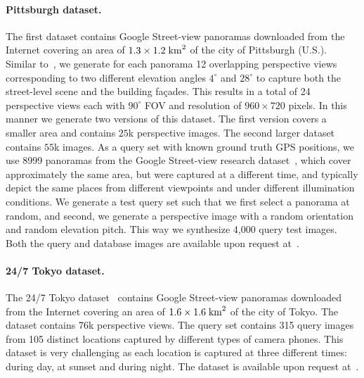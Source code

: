     \paragraph{Pittsburgh dataset.}
      \textcolor{petr}{
 The first dataset contains Google Street-view panoramas downloaded from the Internet covering an area of $1.3 \times 1.2 \; {\rm km}^2$ of the city of Pittsburgh (U.S.). Similar to~\cite{Chen11}, we generate for each panorama 12 overlapping perspective views corresponding to two different elevation angles $4^\circ$ and $28^\circ$ to capture both the street-level scene and the building fa\c{c}ades. This results in a total of 24 perspective views each with $90^\circ$ FOV and resolution of $960 \times 720$ pixels. In this manner we generate two versions of this dataset. The first version covers a smaller area and contains $25$k perspective images.  The second larger dataset contains $55$k images.
    }
    \textcolor{petr}{
      As a query set with known ground truth GPS positions, we use 8999 panoramas from the Google Street-view research dataset~\cite{GoogleResearch}, which cover approximately the same area, but were captured at a different time, and typically depict the same places from different viewpoints and under different illumination conditions.          
      We generate a test query set such that we first select a panorama at random, and second, we generate a perspective image with a random orientation and random elevation pitch. This way we synthesize 4,000 query test images. Both the query and database images are available upon request at~\cite{GronatProjectPage}.
    }

    \paragraph{24/7 Tokyo dataset.}
    \textcolor{petr}{
The 24/7 Tokyo dataset~\cite{Torii2015} contains Google Street-view panoramas downloaded from the Internet covering an area of $1.6 \times 1.6 \; {\rm km}^2$ of the city of Tokyo. The dataset contains 76k perspective views. The query set contains 315 query images from 105 distinct locations captured by different types of camera phones. This dataset is very challenging as each location is captured at three different times: during day, at sunset and during night. 
The dataset is available upon request at~\cite{Torii15project}.
    }


